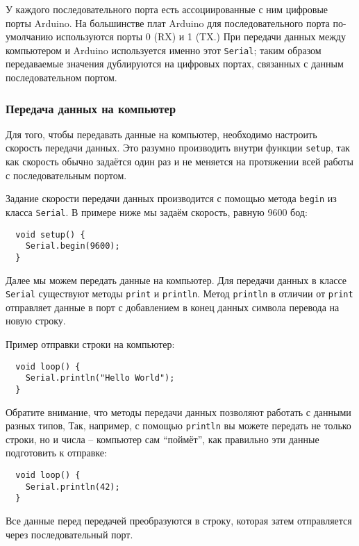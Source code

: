 \documentclass[../sparc.tex]{subfiles}
\begin{document}
У каждого последовательного порта есть ассоциированные с ним цифровые порты
Arduino.  На большинстве плат Arduino для последовательного порта по-умолчанию
используются порты 0 (RX) и 1 (TX.)  При передачи данных между компьютером и
Arduino используется именно этот \texttt{Serial}; таким образом передаваемые
значения дублируются на цифровых портах, связанных с данным последовательном
портом.

\subsubsection{Передача данных на компьютер}

Для того, чтобы передавать данные на компьютер, необходимо настроить скорость
передачи данных.  Это разумно производить внутри функции \texttt{setup}, так как
скорость обычно задаётся один раз и не меняется на протяжении всей работы с
последовательным портом.

Задание скорости передачи данных производится с помощью метода \texttt{begin} из
класса \texttt{Serial}.  В примере ниже мы задаём скорость, равную 9600 бод:

\begin{verbatim}
  void setup() {
    Serial.begin(9600);
  }
\end{verbatim}

Далее мы можем передать данные на компьютер.  Для передачи данных в классе
\texttt{Serial} существуют методы \texttt{print} и \texttt{println}.  Метод
\texttt{println} в отличии от \texttt{print} отправляет данные в порт с
добавлением в конец данных символа перевода на новую строку.

Пример отправки строки на компьютер:

\begin{verbatim}
  void loop() {
    Serial.println("Hello World");
  }
\end{verbatim}

Обратите внимание, что методы передачи данных позволяют работать с данными
разных типов, Так, например, с помощью \texttt{println} вы можете передать не
только строки, но и числа -- компьютер сам ``поймёт'', как правильно эти данные
подготовить к отправке:

\begin{verbatim}
  void loop() {
    Serial.println(42);
  }
\end{verbatim}

Все данные перед передачей преобразуются в строку, которая затем отправляется
через последовательный порт.
\end{document}
